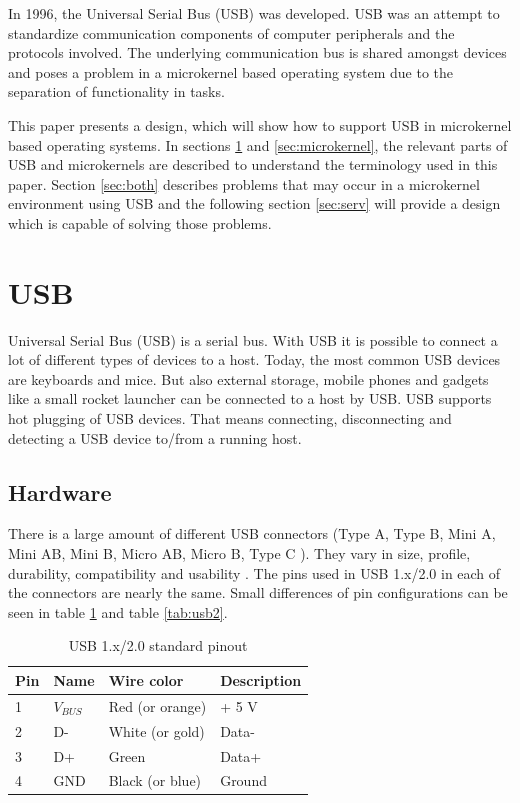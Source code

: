 \documentclass{acm_proc_article-sp}
\begin{document}
In 1996, the Universal Serial Bus (USB) was developed.
USB was an attempt to standardize communication components of computer peripherals and
the protocols involved.
The underlying communication bus is shared amongst devices and poses a problem in a microkernel based
operating system due to the separation of functionality in tasks.

This paper presents a design, which will show how to support USB in microkernel based operating systems.
In sections \ref{sec:usb} and \ref{sec:microkernel}, the relevant parts of USB and microkernels are described
to understand the terminology used in this paper.
Section \ref{sec:both} describes problems that may occur in a microkernel environment using USB and the following
section \ref{sec:serv} will provide a design which is capable of solving those problems.

\section{USB}
\label{sec:usb}
Universal Serial Bus (USB) is a serial bus.
With USB it is possible to connect a lot of different types of devices to a host.
Today, the most common USB devices are keyboards and mice.
But also external storage, mobile phones and gadgets like a small rocket launcher can be connected to a host by USB.
USB supports hot plugging of USB devices.
That means connecting, disconnecting and detecting a USB device to/from a running host.

\subsection{Hardware}
There is a large amount of different USB connectors (Type A, Type B, Mini A, Mini AB, Mini B, Micro AB, Micro B, Type C \cite{usborg}).
They vary in size, profile, durability, compatibility and usability \cite{dowell}.
The pins used in USB 1.x/2.0 in each of the connectors are nearly the same.
Small differences of pin configurations can be seen in table \ref{tab:usb1} and table \ref{tab:usb2}.

\begin{table}
\centering
\caption{USB 1.x/2.0 standard pinout}
\label{tab:usb1}
\begin{tabular}{|l|l|l|l|} \hline
Pin & Name & Wire color & Description\\ \hline
1 & $V_{BUS}$ & Red (or orange) & + 5 V\\ \hline
2 & D- & White (or gold) & Data-\\ \hline
3 & D+ & Green & Data+\\ \hline
4 & GND & Black (or blue) & Ground\\ \hline
\end{tabular}
\end{table}
\end{document}
